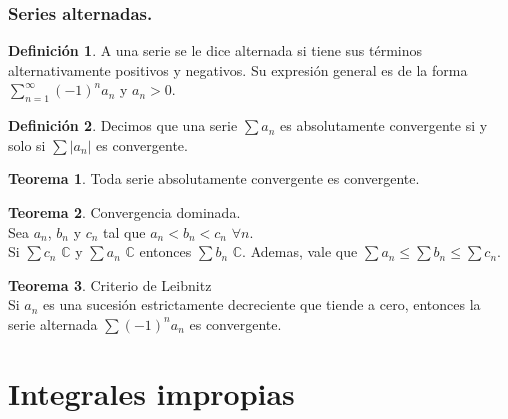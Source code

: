 \documentclass[10pt]{article}
\theoremstyle{definition}
\newtheorem{definition}{Definición}[section]
\newtheorem{theorem}{Teorema}[section]
\begin{document}
\subsubsection{Series alternadas.}
\begin{definition}
	A una serie se le dice alternada si tiene sus términos alternativamente positivos y negativos. Su expresión general es de la forma $\sum_{n=1}^{\infty} \left(-1  \right)^n a_n$ y $a_n>0$.
\end{definition}
\begin{definition}
	Decimos que una serie $\sum a_n$ es absolutamente convergente si y solo si $\sum |a_n|$ es convergente.
\end{definition}
\begin{theorem}
	Toda serie absolutamente convergente es convergente.
\end{theorem}
\begin{theorem}{Convergencia dominada.}
	\\Sea $a_n$, $b_n$ y $c_n$ tal que $a_n<b_n<c_n$ $\forall n$.\\
	Si $\sum c_n$ $\mathbb{C}$ y $\sum a_n$ $\mathbb{C}$ entonces $\sum b_n$ $\mathbb{C}$. Ademas, vale que $\sum a_n \le \sum b_n \le \sum c_n$.
\end{theorem}
\begin{theorem}{Criterio de Leibnitz}
	\\Si $a_n$ es una sucesión estrictamente decreciente que tiende a cero, entonces la serie alternada $\sum \left( -1 \right)^n a_n$ es convergente.
\end{theorem}
\newpage\section{Integrales impropias}
\end{document}
